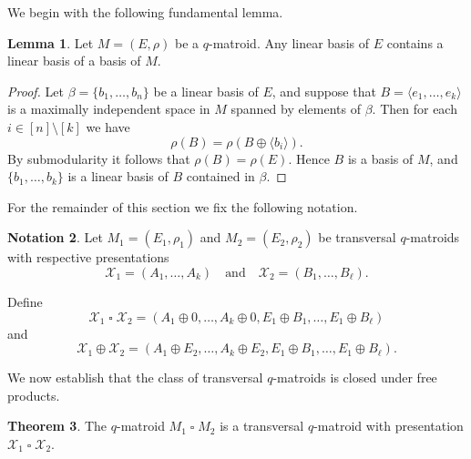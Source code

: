 \documentclass{article}
\theoremstyle{definition}
\newtheorem{theorem}{Theorem}[section]
\newtheorem{notation}[theorem]{{{Notation}}}
\newtheorem{lemma}[theorem]{{{Lemma}}}
\newcommand{\sq}{\mathbin{\square}}
\begin{document}
We begin with the following fundamental lemma.

\begin{lemma}\label{lem:lin_basis_basis}
Let $M=(E,\rho)$ be a $q$-matroid. Any linear basis of $E$ contains a linear basis of a basis of $M$.
\end{lemma}

\begin{proof}
Let $\beta=\{b_1,\dots,b_n\}$ be a linear basis of $E$, and suppose that $B=\langle e_1,\dots,e_k\rangle$ is a maximally independent space in $M$ spanned by elements of $\beta$. Then for each $i\in[n]\setminus[k]$ we have
\[
\rho(B)=\rho(B\oplus\langle b_i\rangle).
\]
By submodularity it follows that $\rho(B)=\rho(E)$. Hence $B$ is a basis of $M$, and $\{b_1,\dots,b_k\}$ is a linear basis of $B$ contained in $\beta$.
\end{proof}

For the remainder of this section we fix the following notation.

\begin{notation}
Let $M_1=(E_1,\rho_1)$ and $M_2=(E_2,\rho_2)$ be transversal $q$-matroids with respective presentations
\[
\mathcal{X}_1=(A_1,\dots,A_k)
\quad\text{and}\quad
\mathcal{X}_2=(B_1,\dots,B_\ell).
\]

Define
\[
\mathcal{X}_1\sq\mathcal{X}_2
=
(A_1\oplus 0,\dots,A_k\oplus 0,E_1\oplus B_1,\dots,E_1\oplus B_\ell)
\]
and
\[
\mathcal{X}_1\oplus\mathcal{X}_2
=
(A_1\oplus E_2,\dots,A_k\oplus E_2,E_1\oplus B_1,\dots,E_1\oplus B_\ell).
\]
\end{notation}

We now establish that the class of transversal $q$-matroids is closed under free products.

\begin{theorem}\label{thm:free_product_transversal}
The $q$-matroid $M_1\sq M_2$ is a transversal $q$-matroid with presentation $\mathcal{X}_1\sq\mathcal{X}_2$.
\end{theorem}
\end{document}
